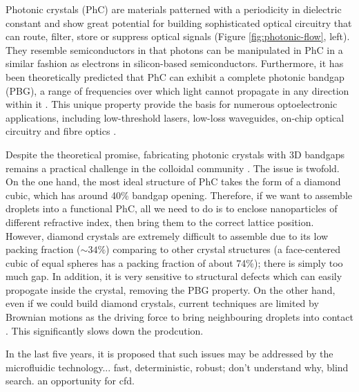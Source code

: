Photonic crystals (PhC) are materials patterned with a periodicity in dielectric constant and show great potential for building sophisticated optical circuitry that can route, filter, store or suppress optical signals (Figure \ref{fig:photonic-flow}, left).
They resemble semiconductors in that photons can be manipulated in PhC in a similar fashion as electrons in silicon-based semiconductors.
Furthermore, it has been theoretically predicted that PhC can exhibit a complete photonic bandgap (PBG), \ie a range of frequencies over which light cannot propagate in any direction within it \citep{Yablonovitch1987}.
This unique property provide the basis for numerous optoelectronic applications, including low-threshold lasers, low-loss waveguides, on-chip optical circuitry and fibre optics \citep{Meade_etal_1994, Joannopoulos_etal_1997, Rinne_etal_2008}.

Despite the theoretical promise, fabricating photonic crystals with 3D bandgaps remains a practical challenge in the colloidal community \citep{Velev_etal_AM2009, Sacanna_etal_COCIS2011, Shen_AS_2016}.
The issue is twofold.
On the one hand, the most ideal structure of PhC takes the form of a diamond cubic, which has around 40\% bandgap opening.
Therefore, if we want to assemble droplets into a functional PhC, all we need to do is to enclose nanoparticles of different refractive index, then bring them to the correct lattice position.
However, diamond crystals are extremely difficult to assemble due to its low packing fraction ($\sim 34\%$) comparing to other crystal structures (\eg a face-centered cubic of equal spheres has a packing fraction of about 74\%); there is simply too much gap. In addition, it is very sensitive to structural defects which can easily propogate inside the crystal, removing the PBG property.
On the other hand, even if we could build diamond crystals, current techniques are limited by Brownian motions as the driving force to bring neighbouring droplets into contact \citep{pine...}. This significantly slows down the prodcution.

In the last five years, it is proposed that such issues may be addressed by the microfluidic technology...
fast, deterministic, robust;
don't understand why, blind search.
an opportunity for cfd.

